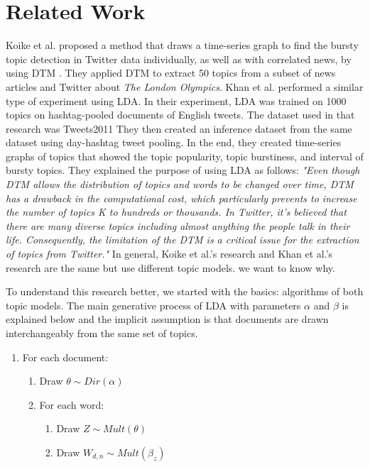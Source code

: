 \chapter{Related Work}
Koike et al. \cite{koike2013time} proposed a method that draws a time-series graph to find the bursty topic detection in Twitter data individually, as well as with correlated news, by using DTM \cite{blei2006dynamic}. They applied DTM to extract 50 topics from a subset of news articles and Twitter about \textit{The London Olympics}. Khan et al. \cite{khan2019events} performed a similar type of experiment using LDA. In their experiment, LDA was trained on 1000 topics on hashtag-pooled documents of English tweets. The dataset used in that research was Tweets2011 %
They then created an inference dataset from the same dataset using day-hashtag tweet pooling. In the end, they created time-series graphs of topics that showed the topic popularity, topic burstiness, and interval of bursty topics. They explained the purpose of using LDA as follows: \emph{"Even though DTM allows the distribution of topics and words to be changed over time, DTM has a drawback in the computational cost, which particularly prevents to increase the number of topics K to hundreds or thousands. In Twitter, it's believed that there are many diverse topics including almost anything the people talk in their life. Consequently, the limitation of the DTM is a critical issue for the extraction of topics from Twitter."} In general, Koike et al.'s research and Khan et al.'s research are the same but use different topic models. we want to know why.

To understand this research better, we started with the basics: algorithms of both topic models. The main generative process of LDA with parameters $\alpha$ and $\beta$ is explained below and the implicit assumption is that documents are drawn interchangeably from the same set of topics.
\begin{enumerate}

\item For each document:
\begin{enumerate}
\item  Draw $\theta \sim Dir(\alpha)$
    \item For each word:
\begin{enumerate}
\item Draw $ Z \sim Mult (\theta) $
\item Draw $ W_{d, n} \sim Mult(\beta_z)$
\end{enumerate}
\end{enumerate}
\end{enumerate}

